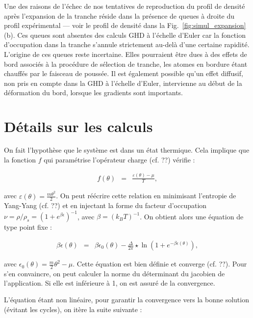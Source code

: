 Une des raisons de l'échec de nos tentatives de reproduction du profil de densité après l'expansion de la tranche réside dans la présence de queues à droite du profil expérimental — voir le profil de densité dans la Fig.~\ref{fig:simul_expansion}(b). Ces queues sont absentes des calculs GHD à l’échelle d’Euler car la fonction d’occupation dans la tranche s’annule strictement au-delà d’une certaine rapidité. L’origine de ces queues reste incertaine. Elles pourraient être dues à des effets de bord associés à la procédure de sélection de tranche, les atomes en bordure étant chauffés par le faisceau de poussée. Il est également possible qu’un effet diffusif, non pris en compte dans la GHD à l’échelle d’Euler, intervienne au début de la déformation du bord, lorsque les gradients sont importants.

\section{Détails sur les calculs}
\label{sec:calcule}

On fait l'hypothèse que le système est dans un état thermique. Cela implique que la fonction $f$ qui paramétrise l'opérateur charge (cf. ??) vérifie :

\begin{eqnarray*}
	f(\theta) & = & \frac{ \varepsilon(\theta) - \mu }{T},
\end{eqnarray*}

avec $\varepsilon(\theta) = \frac{m \theta^2}{2}$. On peut réécrire cette relation en minimisant l'entropie de Yang-Yang (cf. ??) et en injectant la forme du facteur d'occupation $\nu = \rho/\rho_s = (1+e^{\beta \epsilon})^{-1}$, avec $\beta = (k_B T)^{-1}$. On obtient alors une équation de type point fixe :

\begin{eqnarray*}
	\beta \epsilon(\theta) & = & \beta \epsilon_0(\theta) -  \frac{\Delta}{2\pi} \star \ln \left( 1 + e^{-\beta \epsilon(\theta)} \right),
\end{eqnarray*}

avec $\epsilon_0(\theta) = \frac{m}{2} \theta^2 - \mu$. Cette équation est bien définie et converge (cf. ??). Pour s'en convaincre, on peut calculer la norme du déterminant du jacobien de l'application. Si elle est inférieure à 1, on est assuré de la convergence. 

L'équation étant non linéaire, pour garantir la convergence vers la bonne solution (évitant les cycles), on itère la suite suivante :

